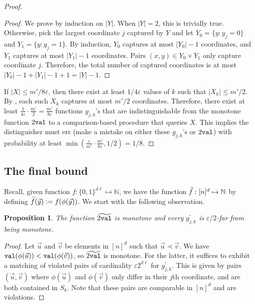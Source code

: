 \documentclass[11pt]{article}
\newtheorem{proposition}[theorem]{Proposition}
\def\eps{\varepsilon}
\newcommand{\NN}{\mathbb{N}}
\begin{document}
\begin{proof}
\begin{proof} We prove by induction on $|Y|$. When $|Y| = 2$, this is trivially true.
Otherwise, pick the largest coordinate $j$ captured by $Y$ and let $Y_0 =\{y: y_j = 0\}$ and $Y_1 = \{y:y_j = 1\}$. 
By induction, $Y_0$ captures at most $|Y_0|-1$ coordinates, and $Y_1$ captures at most $|Y_1| -1$ coordinates.
Pairs $(x,y)\in Y_0\times Y_1$ only capture coordinate $j$. Therefore, the total number of captured coordinates is at most $|Y_0| - 1 + |Y_1| - 1 + 1 = |Y| - 1$.
\end{proof}

\noindent

If $|X| \leq m'/8\eps$, then there exist at least $1/4\eps$ values of $k$
such that $|X_k| \leq m'/2$. 
By , each such $X_k$ captures at most $m'/2$ coordinates.
Therefore, there exist at least 
$\frac{1}{4\eps}\cdot\frac{m'}{2} = \frac{m'}{8\eps}$ functions $g_{j,k}$'s that are indistinguishable from the monotone function $2\v$ to a comparison-based procedure
that queries $X$. 
This implies the distinguisher must err (make a mistake on either these $g_{j,k}$'s or $2\v$) with probability at least $\min(\frac{\eps}{m'}\cdot\frac{m'}{8\eps}, 1/2) = 1/8$.
\end{proof}

\subsection{The final bound}
\def\v{{\tt val}}

Recall, given  function $f:\{0,1\}^{d\ell}\mapsto \NN$, we have 
the function $\f:[n]^d \mapsto \NN$ by defining $\widetilde{f}(\vec{y}) := f(\phi(\vec{y}))$.
We start with the following observation.

\begin{proposition}\label{prop:dist}
The function $\widetilde{2\v}$ is monotone and
every $\widetilde{g_{j,k}}$ is $\eps/2$-far from being monotone.
\end{proposition}

\begin{proof} Let $\vec{u}$ and $\vec{v}$ be elements in $[n]^d$ such that $\vec{u} \prec \vec{v}$.
We have $\v(\phi(\vec{u})) < \v(\phi(\vec{v}))$, so $\widetilde{2\v}$ is monotone.
For the latter, it suffices to exhibit a matching of violated pairs of cardinality $\eps2^{d\ell}$ for $\widetilde{g_{j,k}}$. This is 
given by pairs $(\vec{u},\vec{v})$ where $\phi(\vec{u})$ and $\phi(\vec{v})$ only differ in their
$j$th coordinate, and are both contained in $S_k$. Note that these pairs are comparable in $[n]^d$
and are violations.
\end{proof}
\end{document}
